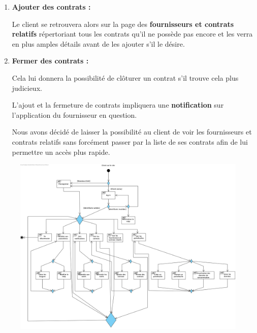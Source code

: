 \begin{enumerate}[-]
\item \textbf{Ajouter des contrats :}\newline

Le client se retrouvera alors sur la page des \textbf{fournisseurs et contrats relatifs} répertoriant tous les contrats qu’il ne possède pas encore et les verra en plus amples détails avant de les ajouter s’il le désire.

\item \textbf{Fermer des contrats :}\newline

Cela lui donnera la possibilité de clôturer un contrat s’il trouve cela plus judicieux.\newline

L’ajout et la fermeture de contrats impliquera une \textbf{notification} sur l’application du fournisseur en question.\newline

Nous avons décidé de laisser la possibilité au client de voir les fournisseurs et contrats relatifs sans forcément passer par la liste de ses contrats afin de lui permettre un accès plus rapide.
\end{enumerate}

\newpage

\begin{figure}[h]
\centering
\includegraphics[width = 1\textwidth]{overview/overview-client.png}
\end{figure}

\newpage

